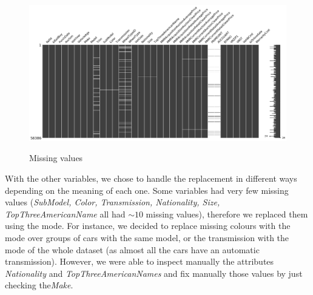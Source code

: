 \documentclass{article}
\begin{document}
	\begin{figure}[]
		\centering
		{\includegraphics[width=.95\textwidth, keepaspectratio]{missingv.png}}
		\caption{{ Missing values }}
		\label{fig:missingval}
	\end{figure}
	
	With the other variables, we chose to handle the replacement in different ways depending on the meaning of each one. Some variables had very few missing values (\emph{SubModel, Color, Transmission, Nationality, Size, TopThreeAmericanName} all had $\sim 10$ missing values), therefore we replaced them using the mode. For instance, we decided to replace missing colours with the mode over groups of cars with the same model, or the transmission with the mode of the whole dataset (as almost all the cars have an automatic transmission). However, we were able to inspect manually the attributes \emph{Nationality} and \emph{TopThreeAmericanNames} and fix manually those values by just checking the\emph{Make}.\\
	
\end{document}
